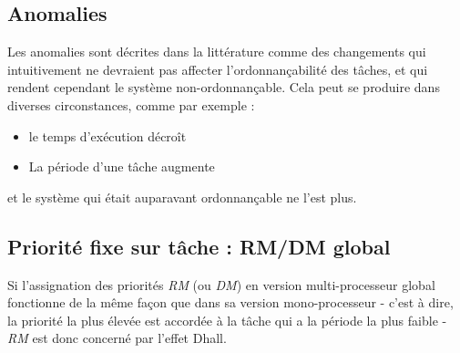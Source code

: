 \documentclass[11pt,a4paper,oneside]{report}
\begin{document}
\subsection{Anomalies}
Les anomalies sont décrites dans la littérature comme des changements qui intuitivement ne devraient 
pas affecter l'ordonnançabilité des tâches, et qui rendent cependant le système non-ordonnançable. 
Cela peut se produire dans diverses circonstances, comme par exemple :\\
\begin{itemize}
	\item le temps d'exécution décroît
	\item La période d'une tâche augmente
\end{itemize}
et le système qui était auparavant ordonnançable ne l'est plus.



\subsection{Priorité fixe sur tâche : RM/DM global}
Si l'assignation des priorités \textit{RM} (ou \textit{DM}) en version multi-processeur global 
fonctionne de la même façon que dans sa version mono-processeur - 
c'est à dire, la priorité la plus élevée est accordée à la tâche qui a la période la plus faible - 
\textit{RM} est donc concerné par l'effet Dhall. \\

\end{document}
